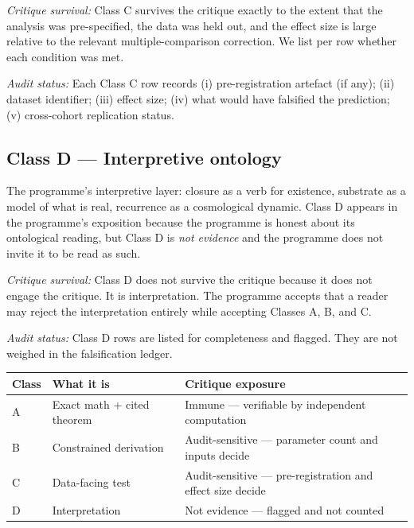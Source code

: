 \documentclass[11pt,a4paper]{article}
\begin{document}
\emph{Critique survival:} Class C survives the critique exactly to
the extent that the analysis was pre-specified, the data was held
out, and the effect size is large relative to the relevant
multiple-comparison correction. We list per row whether each
condition was met.

\emph{Audit status:} Each Class C row records (i) pre-registration
artefact (if any); (ii) dataset identifier; (iii) effect size;
(iv) what would have falsified the prediction; (v) cross-cohort
replication status.

\subsection{Class D --- Interpretive ontology}

The programme's interpretive layer: closure as a verb for existence,
substrate as a model of what is real, recurrence as a cosmological
dynamic. Class D appears in the programme's exposition because the
programme is honest about its ontological reading, but Class D is
\emph{not evidence} and the programme does not invite it to be read
as such.

\emph{Critique survival:} Class D does not survive the critique
because it does not engage the critique. It is interpretation. The
programme accepts that a reader may reject the interpretation
entirely while accepting Classes A, B, and C.

\emph{Audit status:} Class D rows are listed for completeness and
flagged. They are not weighed in the falsification ledger.

\bigskip

\begin{tcolorbox}[colback=yellow!5,colframe=yellow!50!black,title=Class summary]
\begin{tabular}{lll}
\toprule
\textbf{Class} & \textbf{What it is} & \textbf{Critique exposure} \\
\midrule
A & Exact math + cited theorem & Immune --- verifiable by independent computation \\
B & Constrained derivation & Audit-sensitive --- parameter count and inputs decide \\
C & Data-facing test & Audit-sensitive --- pre-registration and effect size decide \\
D & Interpretation & Not evidence --- flagged and not counted \\
\bottomrule
\end{tabular}
\end{tcolorbox}
\end{document}
